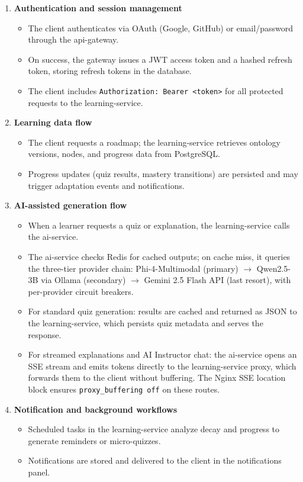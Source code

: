 \begin{enumerate}
    \item \textbf{Authentication and session management}
        \begin{itemize}
            \item The client authenticates via OAuth (Google, GitHub) or email/password through the api-gateway.
            \item On success, the gateway issues a JWT access token and a hashed refresh token, storing refresh tokens in the database.
            \item The client includes \texttt{Authorization: Bearer <token>} for all protected requests to the learning-service.
        \end{itemize}
    \item \textbf{Learning data flow}
        \begin{itemize}
            \item The client requests a roadmap; the learning-service retrieves ontology versions, nodes, and progress data from PostgreSQL.
            \item Progress updates (quiz results, mastery transitions) are persisted and may trigger adaptation events and notifications.
        \end{itemize}
    \item \textbf{AI-assisted generation flow}
        \begin{itemize}
            \item When a learner requests a quiz or explanation, the learning-service calls the ai-service.
            \item The ai-service checks Redis for cached outputs; on cache miss, it queries the three-tier provider chain: Phi-4-Multimodal (primary) $\to$ Qwen2.5-3B via Ollama (secondary) $\to$ Gemini 2.5 Flash API (last resort), with per-provider circuit breakers.
            \item For standard quiz generation: results are cached and returned as JSON to the learning-service, which persists quiz metadata and serves the response.
            \item For streamed explanations and AI Instructor chat: the ai-service opens an SSE stream and emits tokens directly to the learning-service proxy, which forwards them to the client without buffering. The Nginx SSE location block ensures \texttt{proxy\_buffering off} on these routes.
        \end{itemize}
    \item \textbf{Notification and background workflows}
        \begin{itemize}
            \item Scheduled tasks in the learning-service analyze decay and progress to generate reminders or micro-quizzes.
            \item Notifications are stored and delivered to the client in the notifications panel.
        \end{itemize}
\end{enumerate}

